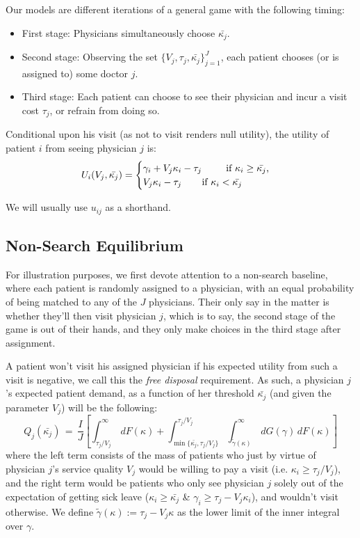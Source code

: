 \documentclass[../main.tex]{subfiles}
\begin{document}
Our models are different iterations of a general game with the following timing:
\begin{itemize}[itemsep=-1pt, topsep=0pt]
    \item First stage: Physicians simultaneously choose $\bar{\kappa_j}$.
    \item Second stage: Observing the set $\{V_j, \tau_j, \bar{\kappa_j}\}_{j=1}^{J}$, each patient chooses (or is assigned to) some doctor $j$.
    \item Third stage: Each patient can choose to see their physician and incur a visit cost $\tau_j$, or refrain from doing so.
\end{itemize}

Conditional upon his visit (as not to visit renders null utility), the utility of patient $i$ from seeing physician $j$ is:
\[
    U_i(V_j,\bar{\kappa_j}) =\begin{cases}
    \gamma_i + V_j \kappa_i - \tau_j \text{  \hspace{0.65cm} if $\kappa_i \geq \bar{\kappa_j}$,} \\
    V_j \kappa_i - \tau_j \text{  \hspace{0.5cm} if $\kappa_i < \bar{\kappa_j}$}
    \end{cases}
\]

We will usually use $u_{ij}$ as a shorthand.

\subsection{Non-Search Equilibrium}

For illustration purposes, we first devote attention to a non-search baseline, where each patient is randomly assigned to a physician, with an equal probability of being matched to any of the $J$ physicians. Their only say in the matter is whether they'll then visit physician $j$, which is to say, the second stage of the game is out of their hands, and they only make choices in the third stage after assignment.

A patient won't visit his assigned physician if his expected utility from such a visit is negative, we call this the \textit{free disposal} requirement. As such, a physician $j$'s expected patient demand, as a function of her threshold $\bar{\kappa_j}$ (and given the parameter $V_j$) will be the following:
\begin{equation}
    Q_j(\bar{\kappa_j}) \,=\, \frac{I}{J}\left[ \int_{\tau_j/V_j}^{\infty}\,dF(\kappa) +  \int_{\min\{\bar{\kappa_j},\tau_j/V_j\}}^{\tau_j/V_j} \int_{\tilde{\gamma}(\kappa)}^{\infty} \,dG(\gamma) \,dF(\kappa) \right] \label{eq:ns_Q}
\end{equation}
where the left term consists of the mass of patients who just by virtue of physician $j$'s service quality $V_j$ would be willing to pay a visit (i.e. $\kappa_i \geq \tau_j/V_j$), and the right term would be patients who only see physician $j$ solely out of the expectation of getting sick leave ($\kappa_i \geq \bar{\kappa_j}$ \& $\gamma_i \geq \tau_j - V_j \kappa_i$), and wouldn't visit otherwise. We define $\tilde{\gamma}(\kappa) := \tau_j - V_j \kappa$ as the lower limit of the inner integral over $\gamma$.
\end{document}
